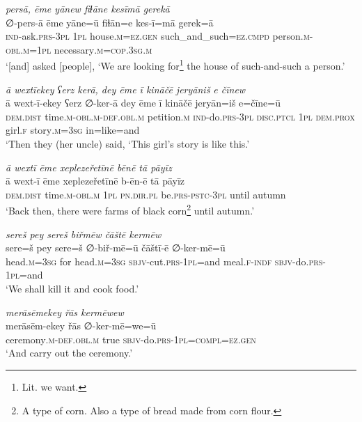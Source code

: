 \ea \label{ZP.84}
\textit{persā, ēme yānew fiɫāne kesīmā gerekā} \\ 
\gll ∅-pers-ā ēme yāne=ū fiɫān=e kes-ī=mā gerek=ā \\ 
 \textsc{ind-}ask\textsc{.prs}\textsc{-3pl} \textsc{1pl} house\textsc{.m}\textsc{\textsc{=ez.gen}} such\_and\_such\textsc{=ez}\textsc{.cmpd} person\textsc{.m}\textsc{-obl}\textsc{.m}\textsc{=1pl} necessary\textsc{.m}\textsc{=cop}\textsc{.3sg}\textsc{.m} \\ 
\glt `[and] asked [people], ‘We are looking for\footnote{Lit. we want.} the house of such-and-such a person.'
\z 
 
\ea \label{ZP.88}
\textit{ā wextīekey ʕerz kerā, dey ēme ī kināčē jeryāniš e čīnew} \\ 
\gll ā wext-ī-ekey ʕerz ∅-ker-ā dey ēme ī kināčē jeryān=iš e=čīne=ū \\ 
 \textsc{dem.dist} time\textsc{.m}\textsc{-obl}\textsc{.m}\textsc{-def}\textsc{.obl}\textsc{.m} petition\textsc{.m} \textsc{ind-}do\textsc{.prs}\textsc{-3pl} \textsc{disc.ptcl} \textsc{1pl} \textsc{dem.prox} girl\textsc{.f} story\textsc{.m}\textsc{=3sg} in=like=and \\ 
\glt `Then they (her uncle) said, ‘This girl’s story is like this.'
\z 
 
\ea \label{ZP.94}
\textit{ā wextī ēme xeplezeřetīnē bēnē tā pāyīz} \\ 
\gll ā wext-ī ēme xeplezeřetīnē b-ēn-ē tā pāyīz \\ 
 \textsc{dem.dist} time\textsc{.m}\textsc{-obl}\textsc{.m} \textsc{1pl} \textsc{pn}\textsc{.dir}\textsc{.pl} be\textsc{.prs}\textsc{-pstc}\textsc{-3pl} until autumn \\ 
\glt `Back then, there were farms of black corn\footnote{A type of corn. Also a type of bread made from corn flour.} until autumn.'
\z 
 
\ea \label{ZP.122}
\textit{sereš pey sereš biřmēw čāštē kermēw} \\ 
\gll sere=š pey sere=š ∅-biř-mē=ū čāštī-ē ∅-ker-mē=ū \\ 
 head\textsc{.m}\textsc{=3sg} for head\textsc{.m}\textsc{=3sg} \textsc{sbjv-}cut\textsc{.prs}\textsc{-1pl}=and meal\textsc{.f}\textsc{-indf} \textsc{sbjv-}do\textsc{.prs}\textsc{-1pl}=and \\ 
\glt `We shall kill it and cook food.'
\z 
 
\ea \label{ZP.123}
\textit{merāsēmekey řās kermēwew} \\ 
\gll merāsēm-ekey řās ∅-ker-mē=we=ū \\ 
 ceremony\textsc{.m}\textsc{-def}\textsc{.obl}\textsc{.m} true \textsc{sbjv-}do\textsc{.prs}\textsc{-1pl}\textsc{=compl}\textsc{\textsc{=ez.gen}} \\ 
\glt `And carry out the ceremony.'
\z 
 
